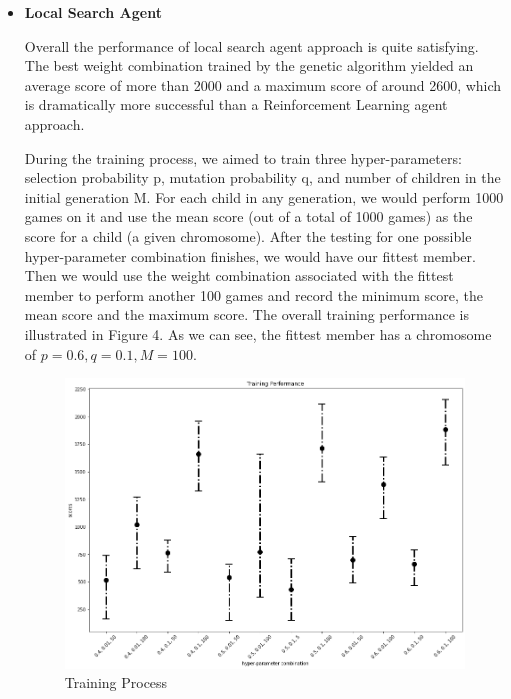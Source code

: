 \documentclass[letterpaper]{article} %
\begin{document}
\begin{itemize}
  
  \item \textbf{Local Search Agent}
  
  Overall the performance of local search agent approach is quite satisfying. The best weight combination trained by the genetic algorithm yielded an average score of more than 2000 and a maximum score of around 2600, which is dramatically more successful than a Reinforcement Learning agent approach.
  
  During the training process, we aimed to train three hyper-parameters: selection probability p, mutation probability q, and number of children in the initial generation M. For each child in any generation, we would perform 1000 games on it and use the mean score (out of a total of 1000 games) as the score for a child (a given chromosome). After the testing for one possible hyper-parameter combination finishes, we would have our fittest member. Then we would use the weight combination associated with the fittest member to perform another 100 games and record the minimum score, the mean score and the maximum score. The overall training performance is illustrated in Figure 4. As we can see, the fittest member has a chromosome of ${p = 0.6, q = 0.1, M = 100}$.
  \begin{figure}[h!]
    \centering
    \includegraphics[width=0.9\linewidth]{figures/GA1}
    \caption{Training Process}
    \label{fig:ga1}
  \end{figure}
  

\end{itemize}
\end{document}
